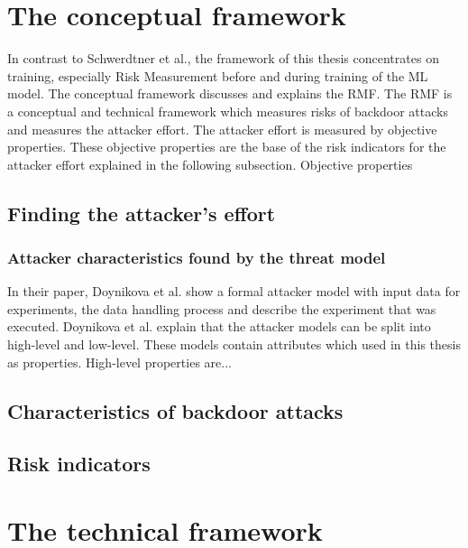 \section{The conceptual framework}
\label{sec:conFrame}

In contrast to Schwerdtner et al., the framework of this thesis concentrates on training, especially Risk Measurement before and during training of the ML model.
The conceptual framework discusses and explains the RMF. The RMF is a conceptual and technical framework which measures risks of backdoor attacks and measures the attacker effort. The attacker effort
is measured by objective properties. These objective properties are the base of the risk indicators for the attacker effort explained in the following subsection. Objective properties

\subsection{Finding the attacker's effort}

\subsubsection*{Attacker characteristics found by the threat model}

In their paper, Doynikova et al. \cite{DBLP:conf/crisis/DoynikovaNGK20} show a formal attacker model with input data for experiments, the data handling process and describe the experiment that was executed. Doynikova et al. explain that the attacker models can be split into high-level and low-level. These models contain attributes which used in this thesis as properties. High-level properties are...

\subsection{Characteristics of backdoor attacks}

\subsection{Risk indicators}
\label{sec:risk_indicators}

\newpage

\section{The technical framework}
\label{sec:techFrame}

